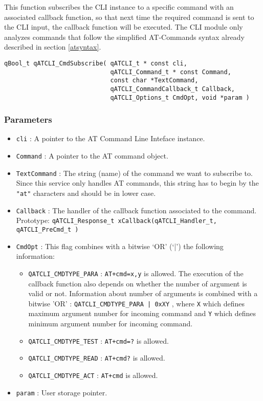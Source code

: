 This function subscribes the CLI instance to a specific command with an associated callback function, so that next time the required command is sent to the CLI input, the callback function will be executed.
\medskip
The CLI module only analyzes commands that follow the simplified AT-Commands syntax already described in section \ref{atsyntax}.
\medskip

\begin{lstlisting}[style=CStyle]
qBool_t qATCLI_CmdSubscribe( qATCLI_t * const cli, 
                             qATCLI_Command_t * const Command, 
                             const char *TextCommand, 
                             qATCLI_CommandCallback_t Callback, 
                             qATCLI_Options_t CmdOpt, void *param )
\end{lstlisting}

\subsubsection*{Parameters}
\begin{itemize}
    \item \lstinline{cli} : A pointer to the AT Command Line Inteface instance. 
    \item \lstinline{Command} :  A pointer to the AT command object.
    \item \lstinline{TextCommand} : The string (name) of the command we want to subscribe to. Since this service only handles AT commands, this string has to begin by the \lstinline{"at"} characters and should be in lower case.
    \item \lstinline{Callback} : The handler of the callback function associated to the command. Prototype: 
    \lstinline{qATCLI_Response_t xCallback(qATCLI_Handler_t, qATCLI_PreCmd_t )}
    \item \lstinline{CmdOpt} : This flag combines with a bitwise ‘OR’ (‘|’) the following information:
    \begin{itemize}
        \item \lstinline{QATCLI_CMDTYPE_PARA} : \lstinline{AT+cmd=x,y} is allowed. The execution of the callback function also depends on whether the number of argument is valid or not. Information about number of arguments is combined with a bitwise 'OR' : \lstinline{QATCLI_CMDTYPE_PARA | 0xXY} , where \lstinline{X} which defines maximum argument number for incoming command and \lstinline{Y} which defines minimum argument number for incoming command.
        \item \lstinline{QATCLI_CMDTYPE_TEST} : \lstinline{AT+cmd=?} is allowed. 
        \item \lstinline{QATCLI_CMDTYPE_READ} : \lstinline{AT+cmd?} is allowed. 
        \item \lstinline{QATCLI_CMDTYPE_ACT} : \lstinline{AT+cmd} is allowed. 
    \end{itemize}
    \item \lstinline{param} :  User storage pointer.
\end{itemize}

